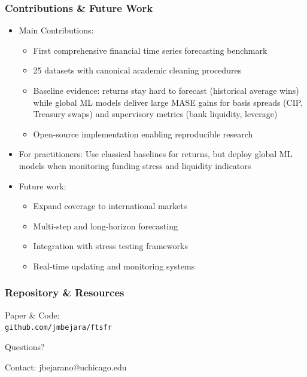 \documentclass[ignorenonframetext, 9pt]{beamer}
\begin{document}
\begin{frame}
  \frametitle{Contributions \& Future Work}
  \begin{itemize}
  \item \alert{Main Contributions:}
  \begin{itemize}
    \item First comprehensive financial time series forecasting benchmark
    \item 25 datasets with canonical academic cleaning procedures
    \item Baseline evidence: returns stay hard to forecast (historical average wins) while global ML models deliver large MASE gains for basis spreads (CIP, Treasury swaps) and supervisory metrics (bank liquidity, leverage)
    \item Open-source implementation enabling reproducible research
  \end{itemize}
  \vspace{0.3cm}
  \item \alert{For practitioners:} Use classical baselines for returns, but deploy global ML models when monitoring funding stress and liquidity indicators
  \vspace{0.3cm}
  \item \alert{Future work:}
  \begin{itemize}
    \item Expand coverage to international markets
    \item Multi-step and long-horizon forecasting
    \item Integration with stress testing frameworks
    \item Real-time updating and monitoring systems
  \end{itemize}
  \end{itemize}
\end{frame}


\begin{frame}
    \frametitle{Repository \& Resources}
    \centering
    \vspace{1cm}
    \Large
    \alert{Paper \& Code:} \\
    \texttt{github.com/jmbejara/ftsfr}
    \vspace{1cm}
  
    \alert{Questions?}
    \vspace{0.5cm}
  
    \normalsize
  Contact: jbejarano@uchicago.edu
  \end{frame}
\end{document}
